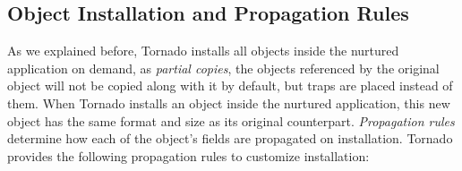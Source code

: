 % 
% 
% 
% 


\subsection{Object Installation and Propagation Rules} \label{sec:mappings}

As we explained before, Tornado installs all objects inside the nurtured application on demand, as \emph{partial copies}, \ie the objects referenced by the original object will not be copied along with it by default, but traps are placed instead of them. %
When Tornado installs an object inside the nurtured application, this new object has the same format and size as its original counterpart. \emph{Propagation rules} determine how each of the object's fields are propagated on installation. Tornado provides the following propagation rules to customize installation:

